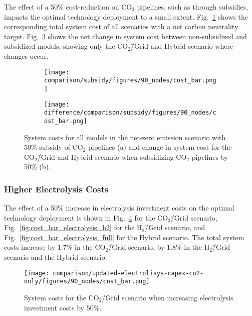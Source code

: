 \documentclass[twocolumn]{article}
\newcommand{\carbon}{CO$_2$}
\newcommand{\carbongrid}{CO$_2$\=/Grid}
\newcommand{\carbonscenario}{CO$_2$\=/Grid scenario}
\newcommand{\hydrogenscenario}{H$_2$\=/Grid scenario}
\newcommand{\hybridscenario}{Hybrid scenario}
\begin{document}
The effect of a 50\% cost-reduction on \carbon{} pipelines, such as through subsidies, impacts the optimal technology deployment to a small extent. Fig.~\ref{fig:cost_bar_subsidy} shows the corresponding total system cost of all scenarios with a net carbon neutrality target. Fig.~\ref{fig:cost_bar_diff_subsidy} shows the net change in system cost between non-subsidized and subsidized models, showing only the \carbongrid{} and \hybridscenario{} where changes occur.

\begin{figure}[ht!]
    \centering
    \begin{subfigure}{.5\textwidth}
        \texttt{[image: comparison/subsidy/figures/90\_nodes/cost\_bar.png]}
        \caption{}
        \label{fig:cost_bar_subsidy}
    \end{subfigure}%
    \begin{subfigure}{.5\textwidth}
        \centering
        \texttt{[image: difference/comparison/subsidy/figures/90\_nodes/cost\_bar.png]}
        \caption{}
        \label{fig:cost_bar_diff_subsidy}
    \end{subfigure}
    \caption{System costs for all models in the net-zero emission scenario with 50\% subsidy of \carbon{} pipelines (a) and change in system cost for the \carbongrid{} and \hybridscenario{} when subsidizing \carbon{} pipelines by 50\% (b).}
\end{figure}


\subsubsection{Higher Electrolysis Costs}


The effect of a 50\% increase in electrolysis investment costs on the optimal technology deployment is shown in Fig.~\ref{fig:cost_bar_electrolysis_co2} for the \carbonscenario{}, Fig.~\ref{fig:cost_bar_electrolysis_h2} for the \hydrogenscenario{}, and Fig.~\ref{fig:cost_bar_electrolysis_full} for the \hybridscenario{}. The total system costs increase by 1.7\% in the \carbonscenario{}, by 1.8\% in the \hydrogenscenario{} and the \hybridscenario{}.



\begin{figure}[ht!]
    \centering
    \texttt{[image: comparison/updated-electrolisys-capex-co2-only/figures/90\_nodes/cost\_bar.png]}
    \caption{System costs for the \carbonscenario{} when increasing electrolysis investment costs by 50\%.}
    \label{fig:cost_bar_electrolysis_co2}
\end{figure}
\end{document}
